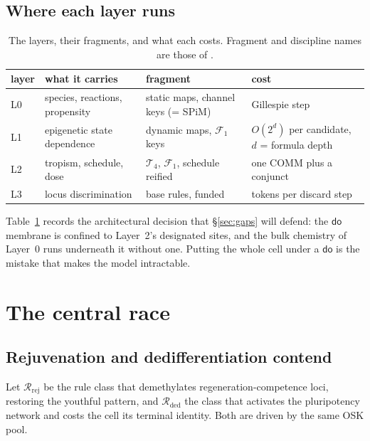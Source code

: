 \documentclass[11pt,a4paper]{article}
\theoremstyle{plain}
\theoremstyle{definition}
\theoremstyle{remark}
\newcommand{\dok}{\textsf{do}}
\newcommand{\Rej}{\mathcal{R}_{\mathrm{rej}}}
\newcommand{\Ded}{\mathcal{R}_{\mathrm{ded}}}
\begin{document}
\subsection{Where each layer runs}

\begin{table}[t]
\centering\footnotesize
\begin{tabular}{@{}>{\raggedright\arraybackslash}p{}>{\raggedright\arraybackslash}p{}>{\raggedright\arraybackslash}p{}>{\raggedright\arraybackslash}p{}@{}}
\toprule
\textbf{layer} & \textbf{what it carries} & \textbf{fragment} & \textbf{cost}\\
\midrule
L0 & species, reactions, propensity & static maps, channel keys (= SPiM) & Gillespie step\\
L1 & epigenetic state dependence & dynamic maps, $\mathcal{F}_1$ keys & $O(2^{d})$ per candidate, $d$ = formula depth\\
L2 & tropism, schedule, dose & $\mathcal{T}_4$, $\mathcal{F}_1$, schedule reified & one COMM plus a conjunct\\
L3 & locus discrimination & base rules, funded & tokens per discard step\\
\bottomrule
\end{tabular}
\caption{The layers, their fragments, and what each costs. Fragment and
discipline names are those of \cite{Interventions}.}\label{tab:layers}
\end{table}

Table~\ref{tab:layers} records the architectural decision that
\S\ref{sec:gaps} will defend: the $\dok$ membrane is confined to Layer~2's
designated sites, and the bulk chemistry of Layer~0 runs underneath it without
one. Putting the whole cell under a $\dok$ is the mistake that makes the model
intractable.

\section{The central race}\label{sec:race}

\subsection{Rejuvenation and dedifferentiation contend}

Let $\Rej$ be the rule class that demethylates regeneration-competence loci,
restoring the youthful pattern, and $\Ded$ the class that activates the
pluripotency network and costs the cell its terminal identity. Both are driven
by the same OSK pool.
\end{document}
